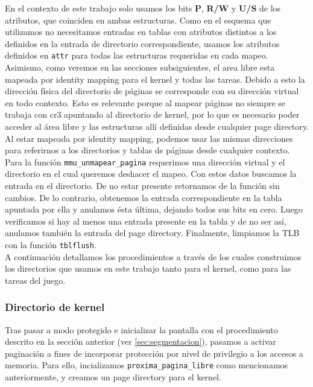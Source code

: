 En el contexto de este trabajo solo usamos los bits \textbf{P}, \textbf{R/W} y \textbf{U/S} de los atributos, que coinciden en ambas estructuras. 
Como en el esquema que utilizamos no necesitamos entradas en tablas con atributos distintos a los definidos en la entrada de directorio correspondiente, usamos los atributos definidos en \verb|attr| para todas las estructuras requeridas en cada mapeo.
Asimismo, como veremos en las secciones subsiguientes, el area libre esta mapeada por identity mapping para el kernel y todas las tareas. Debido a esto la dirección física del directorio de páginas se corresponde con su dirección virtual en todo contexto.
Esto es relevante porque al mapear páginas no siempre se trabaja con cr3 apuntando al directorio de kernel, por lo que es necesario poder acceder al área libre y las estructuras allí definidas desde cualquier page directory. Al estar mapeada por identity mapping, podemos usar las mismas direcciones para referirnos a los directorios y tablas de páginas desde cualquier contexto.\\

Para la función \verb|mmu_unmapear_pagina| requerimos una dirección virtual y el directorio en el cual queremos deshacer el mapeo. 
Con estos datos buscamos la entrada en el directorio. De no estar presente retornamos de la función sin cambios. De lo contrario, obtenemos la entrada correspondiente en la tabla apuntada por ella y anulamos ésta última, dejando todos sus bits en cero. 
Luego verificamos si hay al menos una entrada presente en la tabla y de no ser así, anulamos también la entrada del page directory.
Finalmente, limpiamos la TLB con la función \verb|tblflush|.\\

A continuación detallamos los procedimientos a través de los cuales construimos los directorios que usamos en este trabajo tanto para el kernel, como para las tareas del juego.


\subsubsection{Directorio de kernel}

Tras pasar a modo protegido e inicializar la pantalla con el procedimiento descrito en la sección anterior (ver \ref{sec:segmentacion}), pasamos a activar paginación a fines de incorporar protección por nivel de privilegio a los accesos a memoria.
Para ello, incializamos \verb|proxima_pagina_libre| como mencionamos anteriormente, y creamos un page directory para el kernel.

